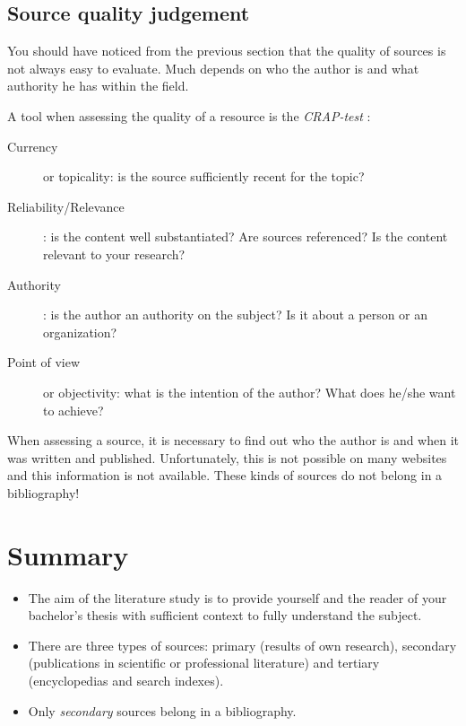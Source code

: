 \subsection{Source quality judgement}
\label{sub:sourcequalityjudgement}

You should have noticed from the previous section that the quality of sources is not always easy to evaluate. Much depends on who the author is and what authority he has within the field.

A tool when assessing the quality of a resource is the \emph{CRAP-test} \autocite{Gratz2015}:

\begin{description}
   \item[Currency] or topicality: is the source sufficiently recent for the topic?
   \item[Reliability/Relevance]: is the content well substantiated? Are sources referenced? Is the content relevant to your research?
   \item[Authority]: is the author an authority on the subject? Is it about a person or an organization?
   \item[Point of view] or objectivity: what is the intention of the author? What does he/she want to achieve?
\end{description}

When assessing a source, it is necessary to find out who the author is and when it was written and published. Unfortunately, this is not possible on many websites and this information is not available. These kinds of sources do not belong in a bibliography!

\section{Summary}
\label{sec:literatureresearchsummary}

\begin{itemize}
   \item The aim of the literature study is to provide yourself and the reader of your bachelor's thesis with sufficient context to fully understand the subject.
   \item There are three types of sources: primary (results of own research), secondary (publications in scientific or professional literature) and tertiary (encyclopedias and search indexes).
   \item Only \emph{secondary} sources belong in a bibliography.
\end{itemize}
